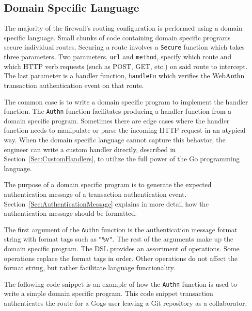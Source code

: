 

\subsection{Domain Specific Language}\label{Sec:DomainSpecificLanguage}

The majority of the firewall's routing configuration is performed using a domain specific language. Small chunks of code containing domain specific programs secure individual routes. Securing a route involves a \lstinline{Secure} function which takes three parameters. Two parameters, \lstinline{url} and \lstinline{method}, specify which route and which HTTP verb requests (such as POST, GET, etc.) on said route to intercept. The last parameter is a handler function, \lstinline{handleFn} which verifies the WebAuthn transaction authentication event on that route. 

The common case is to write a domain specific program to implement the handler function. The \lstinline{Authn} function facilitates producing a handler function from a domain specific program. Sometimes there are edge cases where the handler function needs to manipulate or parse the incoming HTTP request in an atypical way. When the domain specific language cannot capture this behavior, the engineer can write a custom handler directly, described in Section~\ref{Sec:CustomHandlers}, to utilize the full power of the Go programming language.

The purpose of a domain specific program is to generate the expected authentication message of a transaction authentication event. Section~\ref{Sec:AuthenticationMessage} explains in more detail how the authentication message should be formatted. 

The first argument of the \lstinline{Authn} function is the authentication message format string with format tags such as \lstinline{"%v"}. The rest of the arguments make up the domain specific program. The DSL provides an assortment of operations. Some operations replace the format tags in order. Other operations do not affect the format string, but rather facilitate language functionality.

The following code snippet is an example of how the \lstinline{Authn} function is used to write a simple domain specific program. This code snippet transaction authenticates the route for a Gogs user leaving a Git repository as a collaborator. 

